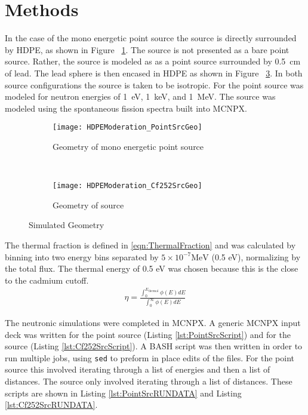 \section{Methods}
\label{sec:Methods}
In the case of the mono energetic point source the source is directly surrounded by HDPE, as shown in Figure ~\ref{fig:PointSrcGeo}. 
The  source is not presented as a bare point source.
Rather, the source is modeled as as a point  source surrounded by \SI{0.5}{\centi\meter}  of lead. The lead sphere is then encased in HDPE as shown in Figure ~\ref{fig:Cf252SrcGeo}.
In both source configurations the source is taken to be isotropic. 
For the point source was modeled for neutron energies of \SI{1}{\electronvolt}, \SI{1}{\kilo\electronvolt}, and \SI{1}{\mega\electronvolt}.
The  source was modeled using the spontaneous fission spectra built into MCNPX.
\begin{figure}
  \centering
  \begin{subfigure}[b]{0.45\textwidth}
    \centering
    \texttt{[image: HDPEModeration\_PointSrcGeo]}
    \caption{Geometry of mono energetic point source}
    \label{fig:PointSrcGeo}
  \end{subfigure}%
  ~
  \begin{subfigure}[b]{0.45\textwidth}
    \centering
    \texttt{[image: HDPEModeration\_Cf252SrcGeo]}
    \caption{Geometry of  source}
    \label{fig:Cf252SrcGeo}
  \end{subfigure}
  \caption{Simulated Geometry}
\end{figure}

The thermal fraction is defined in \eqref{eqn:ThermalFraction} and was calculated by binning into two energy bins separated by $5\times10^{-7}\text{MeV}$ (0.5 eV), normalizing by the total flux.
The thermal energy of 0.5 eV was chosen because this is the close to the cadmium cutoff.
\begin{align}
    \label{eqn:ThermalFraction}
    \eta = \frac{\int_0 ^{E_\text{thermal}} \phi(E)dE}{\int_0^\infty \phi(E)dE}
\end{align}

The neutronic simulations were completed in MCNPX. 
A generic MCNPX input deck was written for the point source (Listing \ref{lst:PointSrcScript}) and for the  source (Listing \ref{lst:Cf252SrcScript}).
A BASH script was then written in order to run multiple jobs, using \verb+sed+ to preform in place edits of the files.
For the point source this involved iterating through a list of energies and then a list of distances.
The  source only involved iterating through a list of distances.
These scripts are shown in Listing \ref{lst:PointSrcRUNDATA} and Listing \ref{lst:Cf252SrcRUNDATA}.

